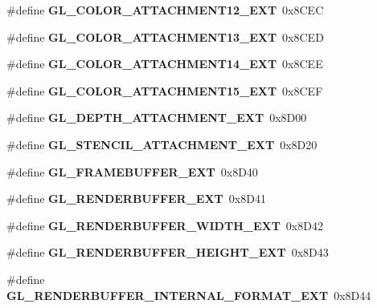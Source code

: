 \begin{DoxyCompactItemize}
\item 
\#define {\bfseries G\+L\+\_\+\+C\+O\+L\+O\+R\+\_\+\+A\+T\+T\+A\+C\+H\+M\+E\+N\+T12\+\_\+\+E\+X\+T}~0x8\+C\+E\+C\label{_s_d_l__opengl_8h_adcf680d12d03d052b276df5bcbd7de88}

\item 
\#define {\bfseries G\+L\+\_\+\+C\+O\+L\+O\+R\+\_\+\+A\+T\+T\+A\+C\+H\+M\+E\+N\+T13\+\_\+\+E\+X\+T}~0x8\+C\+E\+D\label{_s_d_l__opengl_8h_aa7b8ddd745264c4b58892a3e66966526}

\item 
\#define {\bfseries G\+L\+\_\+\+C\+O\+L\+O\+R\+\_\+\+A\+T\+T\+A\+C\+H\+M\+E\+N\+T14\+\_\+\+E\+X\+T}~0x8\+C\+E\+E\label{_s_d_l__opengl_8h_a68304dbddaa9a0f8e6bb75a2e56043cc}

\item 
\#define {\bfseries G\+L\+\_\+\+C\+O\+L\+O\+R\+\_\+\+A\+T\+T\+A\+C\+H\+M\+E\+N\+T15\+\_\+\+E\+X\+T}~0x8\+C\+E\+F\label{_s_d_l__opengl_8h_a7c90bb127cfe0c5ad309c96d62a7b20f}

\item 
\#define {\bfseries G\+L\+\_\+\+D\+E\+P\+T\+H\+\_\+\+A\+T\+T\+A\+C\+H\+M\+E\+N\+T\+\_\+\+E\+X\+T}~0x8\+D00\label{_s_d_l__opengl_8h_a17871868e3ed0792b5782b36b94bd80c}

\item 
\#define {\bfseries G\+L\+\_\+\+S\+T\+E\+N\+C\+I\+L\+\_\+\+A\+T\+T\+A\+C\+H\+M\+E\+N\+T\+\_\+\+E\+X\+T}~0x8\+D20\label{_s_d_l__opengl_8h_a44a68e4acac8d53163b052b77f574ad1}

\item 
\#define {\bfseries G\+L\+\_\+\+F\+R\+A\+M\+E\+B\+U\+F\+F\+E\+R\+\_\+\+E\+X\+T}~0x8\+D40\label{_s_d_l__opengl_8h_ae5a5d93368758da93a44c2fe8df29185}

\item 
\#define {\bfseries G\+L\+\_\+\+R\+E\+N\+D\+E\+R\+B\+U\+F\+F\+E\+R\+\_\+\+E\+X\+T}~0x8\+D41\label{_s_d_l__opengl_8h_ab100b55f57703b4c81a56ff9acf2f74b}

\item 
\#define {\bfseries G\+L\+\_\+\+R\+E\+N\+D\+E\+R\+B\+U\+F\+F\+E\+R\+\_\+\+W\+I\+D\+T\+H\+\_\+\+E\+X\+T}~0x8\+D42\label{_s_d_l__opengl_8h_ab83837bce35855de1ffc3785e824bc91}

\item 
\#define {\bfseries G\+L\+\_\+\+R\+E\+N\+D\+E\+R\+B\+U\+F\+F\+E\+R\+\_\+\+H\+E\+I\+G\+H\+T\+\_\+\+E\+X\+T}~0x8\+D43\label{_s_d_l__opengl_8h_a6f132e96954f63cca94246a874acaddf}

\item 
\#define {\bfseries G\+L\+\_\+\+R\+E\+N\+D\+E\+R\+B\+U\+F\+F\+E\+R\+\_\+\+I\+N\+T\+E\+R\+N\+A\+L\+\_\+\+F\+O\+R\+M\+A\+T\+\_\+\+E\+X\+T}~0x8\+D44\label{_s_d_l__opengl_8h_ac7ad1fe8d7abffcddc91938037978cda}


\end{DoxyCompactItemize}
